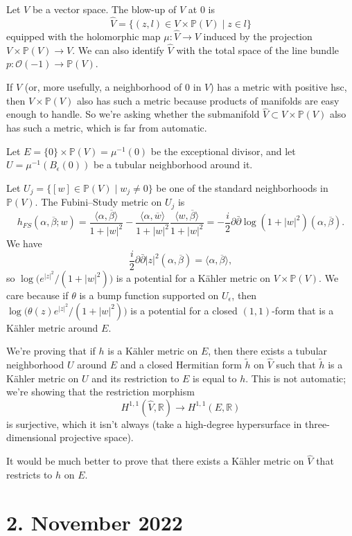 \documentclass[11pt]{article}
\theoremstyle{definition}
\newcommand{\kk}[1]{\mathbb{#1}}
\newcommand{\cc}[1]{\mathcal{#1}}
\def\ov#1{\overline{#1}}
\begin{document}
Let $V$ be a vector space. The blow-up of $V$ at $0$ is
$$
\hat V = \{ (z, l) \in V \times \kk P(V) \mid z \in l \}
$$
equipped with the holomorphic map $\mu : \hat V \to V$ induced by the
projection $V \times \kk P(V) \to V$.
We can also identify $\hat V$ with the total space of the line bundle $p : \cc
O(-1) \to \kk P(V)$.

If $V$ (or, more usefully, a neighborhood of $0$ in $V$) has a metric with
positive hsc, then $V \times \kk P(V)$ also has such a metric because products
of manifolds are easy enough to handle.
So we're asking whether the submanifold $\hat V \subset V \times \kk P(V)$ also
has such a metric, which is far from automatic.

Let $E = \{0\} \times \kk P(V) = \mu^{-1}(0)$ be the exceptional divisor, and
let $U = \mu^{-1}(B_\epsilon(0))$ be a tubular neighborhood around it.

Let $U_j = \{ [w] \in \kk P(V) \mid w_j \not= 0 \}$ be one of the standard
neighborhoods in $\kk P(V)$. The Fubini--Study metric on $U_j$ is
$$
h_{FS}(\alpha, \ov\beta; w)
= \frac{\langle \alpha, \ov\beta \rangle}{1+|w|^2}
- \frac{\langle \alpha, \ov w \rangle}{1+|w|^2}
\frac{\langle w, \ov \beta \rangle}{1+|w|^2}
= -\frac i2 \partial \bar\partial \log(1+|w|^2)(\alpha, \ov\beta).
$$
We have
$$
\frac i2 \partial \bar\partial |z|^2(\alpha, \ov\beta)
= \langle \alpha, \ov\beta \rangle,
$$
so $\log \bigl( e^{|z|^2} / (1 + |w|^2) \bigr)$ is a potential for a K\"ahler
metric on $V \times \kk P(V)$.
We care because if $\theta$ is a bump function supported on $U_\epsilon$, then
$\log \bigl( \theta(z) e^{|z|^2} / (1 + |w|^2) \bigr)$
is a potential for a closed $(1,1)$-form that is a K\"ahler metric around $E$.

We're proving that if $h$ is a K\"ahler metric on $E$, then there exists a
tubular neighborhood $U$ around $E$ and a closed Hermitian form $\tilde h$ on
$\hat V$ such that $\tilde h$ is a K\"ahler metric on $U$ and its restriction
to $E$ is equal to $h$.
This is not automatic; we're showing that the restriction morphism
$$
H^{1,1}(\hat V,\kk R) \to H^{1,1}(E, \kk R)
$$
is surjective, which it isn't always (take a high-degree hypersurface in three-dimensional projective space).

It would be much better to prove that there exists a K\"ahler metric on $\hat
V$ that restricts to $h$ on $E$.



\section{2. November 2022}
\end{document}
